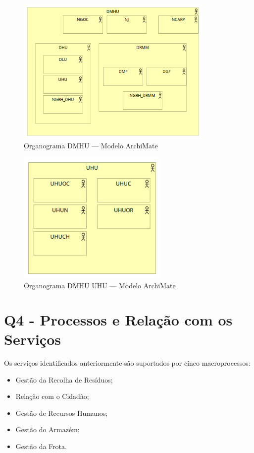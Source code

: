 \documentclass[12pt,a4paper,final]{article}
\begin{document}
    \begin{figure}[H]
        \centering
        \includegraphics[width=0.85\textwidth]{Q3 - Organizational Structure}
        \caption{Organograma DMHU — Modelo ArchiMate}
        \label{fig:3}
    \end{figure}

    \begin{figure}[H]
        \centering
        \includegraphics[width=0.65\textwidth]{Q3 - Organizational Structure - UHU}
        \caption{Organograma DMHU UHU — Modelo ArchiMate}
        \label{fig:10}
    \end{figure}

    \newpage

    \section*{Q4 - Processos e Relação com os Serviços}\label{sec:processos-e-relacao-com-os-servicos}
    Os serviços identificados anteriormente são suportados por cinco macroprocessos:
    \begin{itemize}
        \item Gestão da Recolha de Resíduos;
        \item Relação com o Cidadão;
        \item Gestão de Recursos Humanos;
        \item Gestão do Armazém;
        \item Gestão da Frota.
    \end{itemize}
\end{document}
